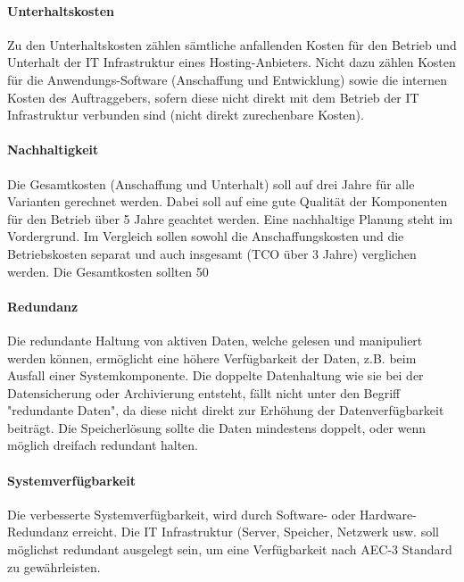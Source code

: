 \paragraph{Unterhaltskosten}\label{Soll-1-2}
Zu den Unterhaltskosten zählen sämtliche anfallenden Kosten für den Betrieb und Unterhalt der IT Infrastruktur eines Hosting-Anbieters. Nicht dazu zählen Kosten für die Anwendungs-Software (Anschaffung und Entwicklung) sowie die internen Kosten des Auftraggebers, sofern diese nicht direkt mit dem Betrieb der IT Infrastruktur verbunden sind (nicht direkt zurechenbare Kosten).

\paragraph{Nachhaltigkeit}\label{Soll-1-3}
Die Gesamtkosten (Anschaffung und Unterhalt) soll auf drei Jahre für alle Varianten gerechnet werden. Dabei soll auf eine gute Qualität der Komponenten für den Betrieb über 5 Jahre geachtet werden. Eine nachhaltige Planung steht im Vordergrund. Im Vergleich sollen sowohl die Anschaffungskosten und die Betriebskosten separat und auch insgesamt (TCO über 3 Jahre) verglichen werden.
Die Gesamtkosten sollten 50%

\setcounter{paragraph}{0}
\renewcommand\theparagraph{Soll-2-\arabic{paragraph}}

\paragraph{Redundanz}\label{Soll-2-1}
Die redundante Haltung von aktiven Daten, welche gelesen und manipuliert werden können, ermöglicht eine höhere Verfügbarkeit der Daten, z.B. beim Ausfall einer Systemkomponente. Die doppelte Datenhaltung wie sie bei der Datensicherung oder Archivierung entsteht, fällt nicht unter den Begriff "redundante Daten", da diese nicht direkt zur Erhöhung der Datenverfügbarkeit beiträgt. Die Speicherlösung sollte die Daten mindestens doppelt, oder wenn möglich dreifach redundant halten. 


\paragraph{Systemverfügbarkeit}\label{Soll-2-2}
Die verbesserte Systemverfügbarkeit, wird durch Software- oder Hardware-Redundanz erreicht. Die IT Infrastruktur (Server, Speicher, Netzwerk usw. soll möglichst redundant ausgelegt sein, um eine Verfügbarkeit nach AEC-3 Standard zu gewährleisten.


